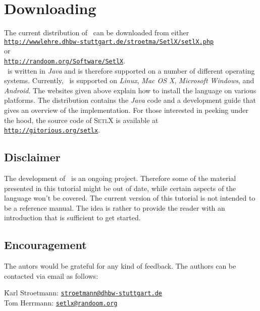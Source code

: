 \section*{Downloading}
The current distribution of  \setlx\ can be downloaded from either
\\[0.2cm]
\hspace*{1.3cm}
\href{http://wwwlehre.dhbw-stuttgart.de/~stroetma/SetlX/setlX.php}{\texttt{http://wwwlehre.dhbw-stuttgart.de/stroetma/SetlX/setlX.php}}
\\[0.2cm]
or
\\[0.2cm]
\hspace*{1.3cm}
\href{http://randoom.org/Software/SetlX}{\texttt{http://randoom.org/Software/SetlX}}.
\\[0.2cm]
\setlx\ is
written in \textsl{Java} and is therefore supported on a number of different operating
systems.  Currently, \setlx\ is supported on \textsl{Linux}, \textsl{Mac OS X},
\textsl{Microsoft Windows}, and \textsl{Android}.  
The websites given above explain how to install the language on various platforms.  
The distribution contains the \textsl{Java} code and a development guide that gives an
overview of the implementation. For those
interested in peeking under the hood, the source code of \textsc{SetlX}
is available at
\\[0.2cm]
\hspace*{1.3cm}
\href{http://gitorious.org/setlx}{\texttt{http://gitorious.org/setlx}}.



\subsection*{Disclaimer}
The development of \setlx\ is an ongoing project.  Therefore some of the material presented in
this tutorial might be out of date, while certain aspects of the language won't be
covered.  The current version of this tutorial is not intended to be a reference manual.
The idea is rather to provide the reader with an introduction that is sufficient to get started.

\subsection*{Encouragement}
The autors would be grateful for any kind of feedback.  The authors can be contacted via
email as follows:
\begin{tabbing}
\qquad \= Karl Stroetmann: \qquad \= \href{mailto:stroetmann@dhbw-stuttgart.de}{\texttt{stroetmann@dhbw-stuttgart.de}} \\[0.2cm]
       \> Tom Herrmann:           \> \href{mailto:setlx@randoom.org}{\texttt{setlx@randoom.org}}
\end{tabbing}

